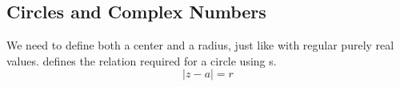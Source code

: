 \subsection{Circles and Complex Numbers}\label{subsec:Circles_Complex_Numbers}
We need to define both a center and a radius, just like with regular purely real values.
 defines the relation required for a circle using s.
\begin{equation}\label{eq:Circles_Complex_Numbers}
  \lvert z - a \rvert = r
\end{equation}


